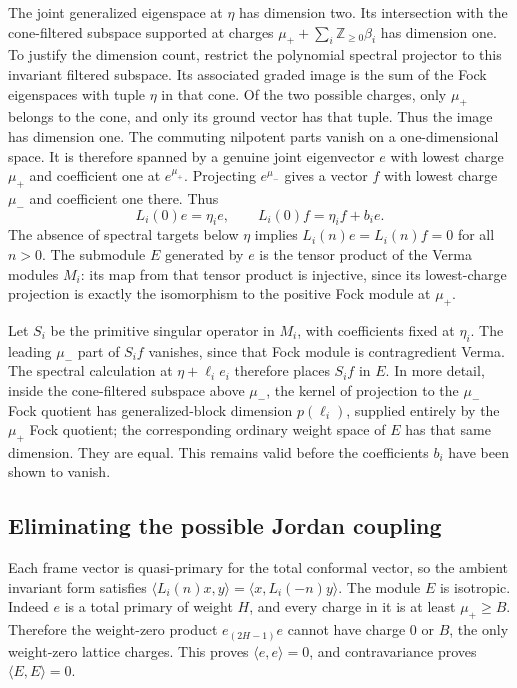 \documentclass[11pt,a4paper]{article}
\numberwithin{equation}{section}
\theoremstyle{definition}\newtheorem{definition}[theorem]{Definition}
\theoremstyle{remark}\newtheorem{remark}[theorem]{Remark}
\begin{document}
The joint generalized eigenspace at $\eta$ has dimension two.  Its
intersection with the cone-filtered subspace supported at charges
$\mu_++\sum_i\mathbb Z_{\geq0}\beta_i$ has dimension one.
To justify the dimension count, restrict the polynomial spectral
projector to this invariant filtered subspace. Its associated graded
image is the sum of the Fock eigenspaces with tuple $\eta$ in that
cone. Of the two possible charges, only $\mu_+$ belongs to the
cone, and only its ground vector has that tuple. Thus the image
has dimension one. The commuting nilpotent parts vanish on a
one-dimensional space. It is therefore spanned by a genuine joint eigenvector $e$ with lowest charge
$\mu_+$ and coefficient one at $e^{\mu_+}$.  Projecting $e^{\mu_-}$ gives a vector $f$ with
lowest charge $\mu_-$ and coefficient one there.  Thus
\[
 L_i(0)e=\eta_i e,\qquad L_i(0)f=\eta_i f+b_i e.
\]
The absence of spectral targets below $\eta$ implies $L_i(n)e=L_i(n)f=0$
for all $n>0$.  The submodule $E$ generated by $e$ is the tensor product
of the Verma modules $M_i$: its map from that tensor product is
injective, since its lowest-charge projection is exactly the
isomorphism to the positive Fock module at $\mu_+$.

Let $S_i$ be the primitive singular operator in $M_i$, with coefficients
fixed at $\eta_i$.  The leading $\mu_-$ part of $S_i f$ vanishes, since
that Fock module is contragredient Verma.  The spectral calculation at
$\eta+\ell_i e_i$ therefore places $S_i f$ in $E$.  In more detail, inside
the cone-filtered subspace above $\mu_-$, the kernel of projection to
the $\mu_-$ Fock quotient has generalized-block dimension
$p(\ell_i)$, supplied entirely by the $\mu_+$ Fock quotient; the
corresponding ordinary weight space of $E$ has that same dimension.
They are equal.  This remains valid before the coefficients $b_i$ have
been shown to vanish.

\subsection*{Eliminating the possible Jordan coupling}
Each frame vector is quasi-primary for the total conformal vector, so
the ambient invariant form satisfies
$\langle L_i(n)x,y\rangle=\langle x,L_i(-n)y\rangle$.
The module $E$ is isotropic.  Indeed $e$ is a total primary of weight
$H$, and every charge in it is at least $\mu_+\geq B$.  Therefore the
weight-zero product $e_{(2H-1)}e$ cannot have charge $0$ or $B$, the only
weight-zero lattice charges.  This proves $\langle e,e\rangle=0$,
and contravariance proves $\langle E,E\rangle=0$.
\end{document}
